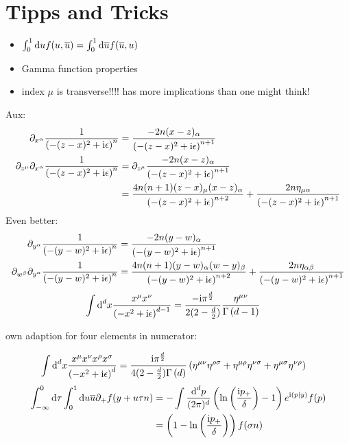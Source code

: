 \ifdefined\mainprogram{}
\else

\fi

\section{Tipps and Tricks}
\begin{itemize}
	\item $\int _0^1 \text{d} u  f(u,\overline u) = \int _0^1 \text{d} \overline u  f(\overline u, u)$
	\item Gamma function properties
	\item index $\mu$ is transverse!!!! has more implications than one might think!
\end{itemize}


Aux:
\begin{align}
	\partial_{x^\alpha} \frac{1}{ \left(-(z-x)^2+\text{i}\epsilon\right)^{n}}
	&=
	\frac{-2n(x-z)_\alpha}{ \left(-(z-x)^2+\text{i}\epsilon\right)^{n+1}}
	\\
	\partial_{z^\mu}\partial_{x^\alpha} \frac{1}{ \left(-(z-x)^2+\text{i}\epsilon\right)^{n}}
	&=
	\partial_{z^\mu}\frac{-2n(x-z)_\alpha}{ \left(-(z-x)^2+\text{i}\epsilon\right)^{n+1}}
	\\
	&=
	\frac{4n(n+1)(z-x)_\mu(x-z)_\alpha}{ \left(-(z-x)^2+\text{i}\epsilon\right)^{n+2}} + 
	\frac{2n\eta_{\mu\alpha}}{ \left(-(z-x)^2+\text{i}\epsilon\right)^{n+1}}
\end{align}
Even better: 
\begin{align}
	\partial_{y^\alpha} \frac{1}{ \left(-(y-w)^2+\text{i}\epsilon\right)^{n}}
	&=
	\frac{-2n(y-w)_\alpha}{ \left(-(y-w)^2+\text{i}\epsilon\right)^{n+1}}
	\\
	\partial_{w^\beta}\partial_{y^\alpha} \frac{1}{ \left(-(y-w)^2+\text{i}\epsilon\right)^{n}}
	&=
	\frac{4n(n+1)(y-w)_\alpha(w-y)_\beta}{ \left(-(y-w)^2+\text{i}\epsilon\right)^{n+2}}+\frac{2n\eta_{\alpha\beta}}{ \left(-(y-w)^2+\text{i}\epsilon\right)^{n+1}}
\end{align}
\begin{align}
	\int \text{d} ^d x \frac{x^\mu x^\nu}{\left(-x^2+\text{i} \epsilon\right)^{d-1}}
	&=
	\frac{-\text{i} \pi^{\frac{d}{2}}}{2(2-\frac{d}{2})}\frac{\eta^{\mu\nu}}{\Gamma\left(d-1\right)}
\end{align}

own adaption for four elements in numerator:

\begin{align}
	\int \text{d} ^d  x \frac{x^\mu x^\nu x^\rho x^\sigma}{\left(-x^2+\text{i} \epsilon\right)^{d}}
	&=
	\frac{\text{i} \pi^{\frac{d}{2}}}{4(2-\frac{d}{2})\Gamma\left(d\right)}\left(\eta^{\mu\nu}\eta^{\rho \sigma} + \eta^{\mu \rho} \eta^{\nu \sigma} +\eta^{\mu \sigma}\eta^{\nu \rho}\right)	
\end{align}
\begin{align}
\int_{-\infty}^{0} \text{d} \tau \int_0^1 \text{d} u \overline u \partial_+f(y+  u \tau n)
&=
-\int \frac{\text{d} ^d p}{(2\pi)^d}\left( \ln\left(\frac{\text{i} p_{+}}{\delta}\right) -1\right) e^{\text{i} (p|y)}f(p)
\\
&=
\left(1-\ln\left(\frac{\text{i} p_{+}}{\delta}\right)\right)f(\sigma n)
\end{align}
\ifdefined\mainprogram{}
\else

\fi